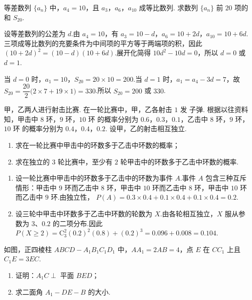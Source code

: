 \begin{problem}
等差数列 \(\{a_{n}\}\) 中，\(a_{4} = 10\)，且 \(a_{3}\)，\(a_{6}\)，\(a_{10}\) 成等比数列. 求数列 \(\{a_{n}\}\) 前 \(20\) 项的和 \(S_{20}\).
\end{problem}

\begin{solution}
设等差数列的公差为 \(d\).由 \(a_4=10\)，有 \(a_3=10-d\)，\(a_6=10+2d\)，\(a_{10}=10+6d\).三项成等比数列的充要条件为中间项的平方等于两端项的积，因此
\((10+2d)^2=(10-d)(10+6d)\).展开化简得 \(10d^2-10d=0\)，所以 \(d=0\) 或 \(d=1\).

当 \(d=0\) 时，\(a_1=10\)，\(S_{20}=20\times10=200\).当 \(d=1\) 时，\(a_1=a_4-3d=7\)，故 \(S_{20}=\dfrac{20}{2}\bigl(2\times7+19\times1\bigr)=330\).所以 \(S_{20}=200\) 或 \(330\).
\end{solution}

\begin{problem}
甲，乙两人进行射击比赛. 在一轮比赛中，甲，乙各射击 \(1\text{ 发}\) 子弹. 根据以往资料知，甲击中 \(8\text{ 环}\)，\(9\text{ 环}\)，\(10\text{ 环}\) 的概率分别为 \(0.6\)，\(0.3\)，\(0.1\)，乙击中 \(8\text{ 环}\)，\(9\text{ 环}\)，\(10\text{ 环}\) 的概率分别为 \(0.4\)，\(0.4\)，\(0.2\). 设甲，乙的射击相互独立.

\begin{enumerate}
\item 求在一轮比赛中甲击中的环数多于乙击中环数的概率；
\item 求在独立的 \(3\) 轮比赛中，至少有 \(2\) 轮甲击中的环数多于乙击中环数的概率.
\end{enumerate}
\end{problem}

\begin{solution}
\begin{enumerate}
\item 设一轮比赛中甲击中的环数多于乙击中的环数为事件 \(A\).事件 \(A\) 包含三种互斥情形：甲击中 \(9\) 环而乙击中 \(8\) 环，甲击中 \(10\) 环而乙击中 \(8\) 环，甲击中 \(10\) 环而乙击中 \(9\) 环.由独立性，
\(P(A)=0.3\times0.4+0.1\times0.4+0.1\times0.4=0.2\).
\item 设三轮中甲击中环数多于乙击中环数的轮数为 \(X\).由各轮相互独立，\(X\) 服从参数为 \(3\)、\(0.2\) 的二项分布.因此
\(P(X\geqslant2)=\mathrm C_3^2(0.2)^2(0.8)+(0.2)^3=0.096+0.008=0.104\).
\end{enumerate}
\end{solution}

\begin{problem}
如图，正四棱柱 \(ABCD - A_{1}B_{1}C_{1}D_{1}\) 中，\(AA_{1} = 2AB = 4\)，点 \(E\) 在 \(CC_{1}\) 上且 \(C_{1}E = 3EC\).

\begin{enumerate}
\item 证明：\(A_{1}C \perp\) 平面 \(BED\)；
\item 求二面角 \(A_{1} - DE - B\) 的大小.
\end{enumerate}

\end{problem}

